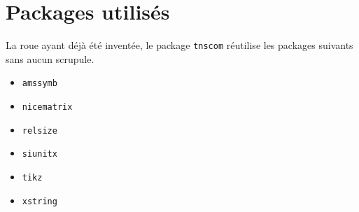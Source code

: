 \documentclass[12pt,a4paper]{article}
\begin{document}
\section{Packages utilisés}

La roue ayant déjà été inventée, le package \verb#tnscom# réutilise les packages suivants sans aucun scrupule.

\begin{multicols}{4}
    \begin{itemize}
\item \verb#amssymb#
    \item \verb#nicematrix#
    \item \verb#relsize#
    \item \verb#siunitx#
    \item \verb#tikz#
    \item \verb#xstring#
    \end{itemize}
\end{multicols}
\end{document}
